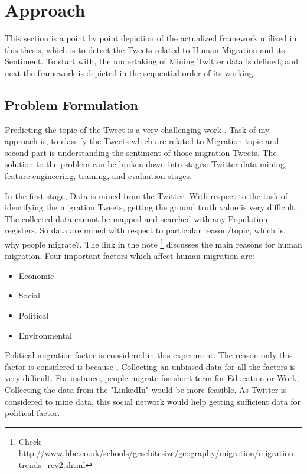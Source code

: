 \chapter{Approach}\label{chap:approach}
This section is a point by point depiction of the actualized framework utilized in this thesis, which is to detect the Tweets related to Human Migration  and its Sentiment. To start with, the undertaking of Mining Twitter data is defined, and next the framework is depicted in the sequential order of its working.

\section{Problem Formulation}

Predicting the topic of the Tweet is a very challenging work . Task of my approach is, to classify the Tweets which are related to Migration topic and second part is understanding the sentiment of those migration Tweets. The solution to the problem can be broken down into stages: Twitter data mining, feature engineering, training, and evaluation stages.

In the first stage, Data is mined from the Twitter. With respect to the task of identifying the migration Tweets, getting the ground truth value is very difficult. The collected data cannot be mapped and searched with any Population registers. So data are mined with respect to particular reason/topic, which is, why people migrate?. The link in the note  \footnote{Check \url{http://www.bbc.co.uk/schools/gcsebitesize/geography/migration/migration_trends_rev2.shtml}  } discusses the main reasons for human migration. Four important factors which affect human migration are:

\begin{itemize}
  \item Economic
  \item Social
    \item Political
  \item Environmental
\end{itemize}
Political migration factor is considered in this experiment. The reason only this factor is considered is because , Collecting an unbiased data for all the factors is very difficult. For instance, people migrate for short term for Education or Work, Collecting the data from the "LinkedIn" would be more feasible. As Twitter is considered to mine data, this social network would help getting sufficient data for political factor. 

